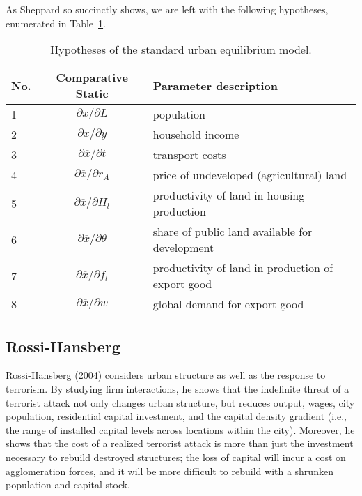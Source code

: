\documentclass[preprint,2p,12pt]{elsarticle}
\begin{document}
As Sheppard so succinctly shows, we are left with the following hypotheses, enumerated in Table~\ref{generalHypotheses}.
\begin{table}[h!]
    \begin{tabular}{ | l | c | l | }\hline
    No. & Comparative Static & Parameter description                                                                    \\ \hline
    1   & $\partial \overline{x} / \partial L$                         & population                                                 \\ \hline
    2   & $\partial \overline{x} / \partial y$                         & household income                                           \\ \hline
    3   & $\partial \overline{x} / \partial t$                         & transport costs                                              \\ \hline
    4   & $\partial \overline{x} / \partial r_A$                         & price of undeveloped (agricultural) land                                     \\ \hline
    5   & $\partial \overline{x} / \partial H_l$                         & productivity of land in housing production     \\ \hline
    6   & $\partial \overline{x} / \partial \theta$                         & share of public land available for development                        \\ \hline
    7   & $\partial \overline{x} / \partial f_l$                         & productivity of land in production of export good \\ \hline
    8   & $\partial \overline{x} / \partial w$                         & global demand for export good                                \\ \hline
    \end{tabular}
    \caption{\label{generalHypotheses}Hypotheses of the standard urban equilibrium model.}
\end{table}


\subsection{\sc Rossi-Hansberg}
Rossi-Hansberg (2004) considers urban structure as well as the response to terrorism. By studying firm interactions, he shows that the indefinite threat of a terrorist attack not only changes urban structure, but reduces output, wages, city population, residential capital investment, and the capital density gradient (i.e., the range of installed capital levels across locations within the city). Moreover, he shows that the cost of a realized terrorist attack is more than just the investment necessary to rebuild destroyed structures; the loss of capital will incur a cost on agglomeration forces, and it will be more difficult to rebuild with a shrunken population and capital stock.
\end{document}
